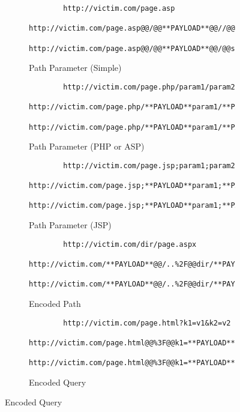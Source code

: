 \begin{figure}
    \centering

    \begin{subfigure}[t]{1\linewidth}
        \begin{lstlisting}
        http://victim.com/page.asp
        http://victim.com/page.asp@@/@@**PAYLOAD**@@//@@
        http://victim.com/page.asp@@/@@**PAYLOAD**@@/@@style.css
        \end{lstlisting}
        \caption{Path Parameter (Simple)}
        \label{rpo:fig:taint:parameter_simple}
    \end{subfigure}

    \begin{subfigure}[t]{1\linewidth}
        \begin{lstlisting}
        http://victim.com/page.php/param1/param2
        http://victim.com/page.php/**PAYLOAD**param1/**PAYLOAD**param2@@//@@
        http://victim.com/page.php/**PAYLOAD**param1/**PAYLOAD**param2@@/@@style.css
        \end{lstlisting}
        \caption{Path Parameter (PHP or ASP)}
        \label{rpo:fig:taint:parameter_php}
    \end{subfigure}

    \begin{subfigure}[t]{1\linewidth}
        \begin{lstlisting}
        http://victim.com/page.jsp;param1;param2
        http://victim.com/page.jsp;**PAYLOAD**param1;**PAYLOAD**param2@@//@@
        http://victim.com/page.jsp;**PAYLOAD**param1;**PAYLOAD**param2@@/@@style.css
        \end{lstlisting}
        \caption{Path Parameter (JSP)}
        \label{rpo:fig:taint:parameter_jsp}
    \end{subfigure}

    \begin{subfigure}[t]{1\linewidth}
        \begin{lstlisting}
        http://victim.com/dir/page.aspx
        http://victim.com/**PAYLOAD**@@/..%2F@@dir/**PAYLOAD**@@/..%2F@@page.aspx@@//@@
        http://victim.com/**PAYLOAD**@@/..%2F@@dir/**PAYLOAD**@@/..%2F@@page.aspx@@/@@style.css
        \end{lstlisting}
        \caption{Encoded Path}
        \label{rpo:fig:taint:path}
    \end{subfigure}

    \begin{subfigure}[t]{1\linewidth}
        \begin{lstlisting}
        http://victim.com/page.html?k1=v1&k2=v2
        http://victim.com/page.html@@%3F@@k1=**PAYLOAD**v1&k2=**PAYLOAD**v2@@//@@
        http://victim.com/page.html@@%3F@@k1=**PAYLOAD**v1&k2=**PAYLOAD**v2@@/@@style.css
        \end{lstlisting}
        \caption{Encoded Query}
        \label{rpo:fig:taint:query}
    \end{subfigure}


\end{figure}
